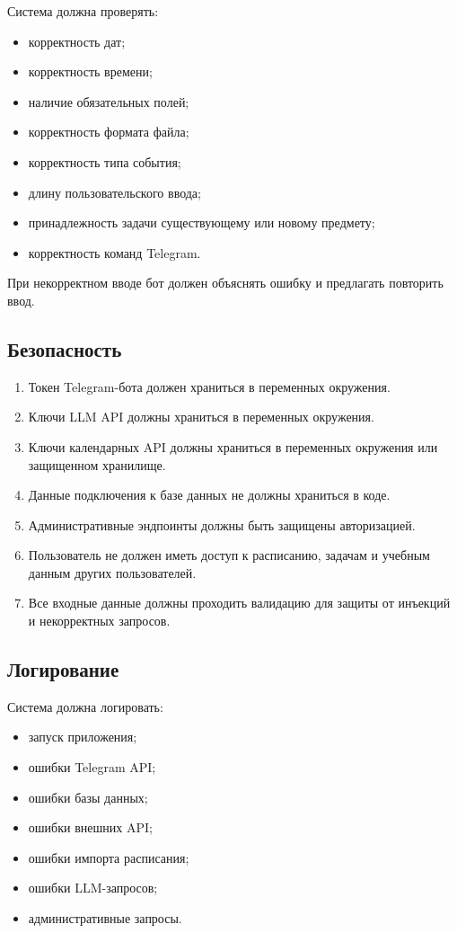 \documentclass[10pt,a4paper,final]{article} %
\begin{document}
Система должна проверять:

\begin{itemize}
    \item корректность дат;
    \item корректность времени;
    \item наличие обязательных полей;
    \item корректность формата файла;
    \item корректность типа события;
    \item длину пользовательского ввода;
    \item принадлежность задачи существующему или новому предмету;
    \item корректность команд Telegram.
\end{itemize}

При некорректном вводе бот должен объяснять ошибку и предлагать повторить ввод.

\subsection{Безопасность}

\begin{enumerate}[label=\arabic*.]
    \item Токен Telegram-бота должен храниться в переменных окружения.
    \item Ключи LLM API должны храниться в переменных окружения.
    \item Ключи календарных API должны храниться в переменных окружения или защищенном хранилище.
    \item Данные подключения к базе данных не должны храниться в коде.
    \item Административные эндпоинты должны быть защищены авторизацией.
    \item Пользователь не должен иметь доступ к расписанию, задачам и учебным данным других пользователей.
    \item Все входные данные должны проходить валидацию для защиты от инъекций и некорректных запросов.
\end{enumerate}

\subsection{Логирование}

Система должна логировать:

\begin{itemize}
    \item запуск приложения;
    \item ошибки Telegram API;
    \item ошибки базы данных;
    \item ошибки внешних API;
    \item ошибки импорта расписания;
    \item ошибки LLM-запросов;
    \item административные запросы.
\end{itemize}
\end{document}
